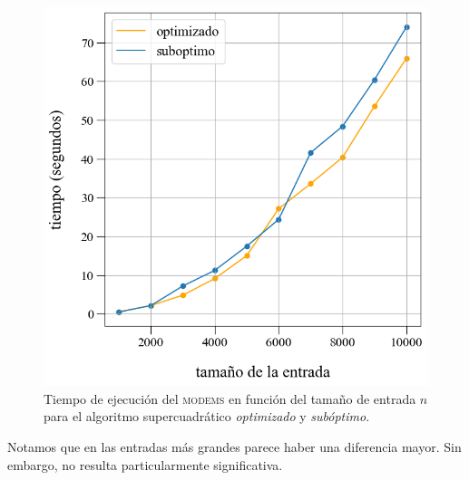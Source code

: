 \begin{figure}[!htbp]
    \includegraphics[scale=0.4, clip]{./files/src/.media/comparacion_DSU.png}
    \caption{Tiempo de ejecución del \textsc{modems} en función del tamaño de entrada $n$ para el algoritmo supercuadrático \textit{optimizado} y \textit{subóptimo}.}
\end{figure}

Notamos que en las entradas más grandes parece haber una diferencia mayor. Sin embargo, no resulta particularmente significativa.